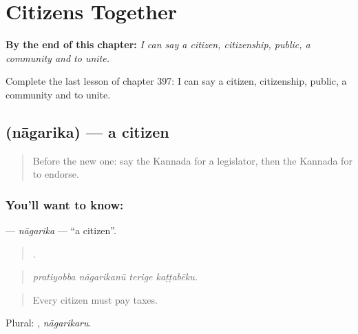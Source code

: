 
\chapter{Citizens Together}
\label{ch:ka-citizens-together}

\begin{chapteropening}
\textbf{By the end of this chapter:} \emph{I can say a citizen, citizenship, public, a community and to unite.}

Complete the last lesson of chapter 397: I can say a citizen, citizenship, public, a community and to unite.
\end{chapteropening}

\section[\texorpdfstring{\kn{ನಾಗರಿಕ} (nāgarika)}{ನಾಗರಿಕ (nāgarika)}]{ (nāgarika) — a citizen}

\label{lesson:KA-C397-nagarika}



\begin{quote}
Before the new one: say the Kannada for a legislator, then the Kannada for to endorse.
\end{quote}

\subsection*{You'll want to know: }
\textbf{} — \emph{nāgarika} — \textquotedblleft{}a citizen\textquotedblright{}.

\begin{quote}
   .
\end{quote}

\begin{quote}
\emph{pratiyobba nāgarikanū terige kaṭṭabēku.}
\end{quote}

\begin{quote}
Every citizen must pay taxes.
\end{quote}

Plural: , \emph{nāgarikaru}.

